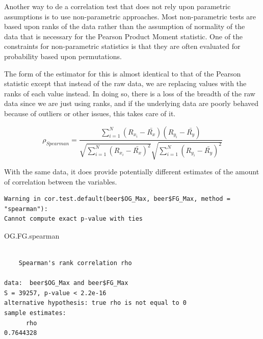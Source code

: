 \documentclass[
  letterpaper,
]{book}
\newenvironment{Shaded}{\begin{snugshade}}{\end{snugshade}}
\newcommand{\AttributeTok}[1]{\textcolor[rgb]{0.40,0.45,0.13}{#1}}
\newcommand{\FunctionTok}[1]{\textcolor[rgb]{0.28,0.35,0.67}{#1}}
\newcommand{\NormalTok}[1]{\textcolor[rgb]{0.00,0.23,0.31}{#1}}
\newcommand{\OtherTok}[1]{\textcolor[rgb]{0.00,0.23,0.31}{#1}}
\newcommand{\SpecialCharTok}[1]{\textcolor[rgb]{0.37,0.37,0.37}{#1}}
\newcommand{\StringTok}[1]{\textcolor[rgb]{0.13,0.47,0.30}{#1}}
\begin{document}
Another way to de a correlation test that does not rely upon parametric
assumptions is to use non-parametric approaches. Most non-parametric
tests are based upon ranks of the data rather than the assumption of
normality of the data that is necessary for the Pearson Product Moment
statistic. One of the constraints for non-parametric statistics is that
they are often evaluated for probability based upon permutations.

The form of the estimator for this is almost identical to that of the
Pearson statistic except that instead of the raw data, we are replacing
values with the ranks of each value instead. In doing so, there is a
loss of the breadth of the raw data since we are just using ranks, and
if the underlying data are poorly behaved because of outliers or other
issues, this takes care of it.

\[
\rho_{Spearman} = \frac{ \sum_{i=1}^N(R_{x_i} - \bar{R_{x}})(R_{y_i} - \bar{R_{y}})}{\sqrt{\sum_{i=1}^N(R_{x_i} - \bar{R_{x}})^2}\sqrt{\sum_{i=1}^N(R_{y_i} - \bar{R_{y}})^2}}
\]

With the same data, it does provide potentially different estimates of
the amount of correlation between the variables.

\begin{Shaded}
\end{Shaded}

\begin{verbatim}
Warning in cor.test.default(beer$OG_Max, beer$FG_Max, method = "spearman"):
Cannot compute exact p-value with ties
\end{verbatim}

\begin{Shaded}
\begin{Highlighting}[]
\NormalTok{OG.FG.spearman}
\end{Highlighting}
\end{Shaded}

\begin{verbatim}

    Spearman's rank correlation rho

data:  beer$OG_Max and beer$FG_Max
S = 39257, p-value < 2.2e-16
alternative hypothesis: true rho is not equal to 0
sample estimates:
      rho 
0.7644328 
\end{verbatim}
\end{document}
